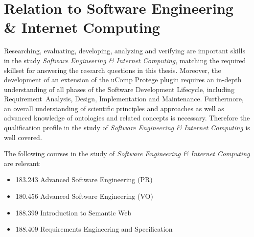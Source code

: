 \documentclass[12pt, notitlepage]{article}
\begin{document}
\section{Relation to Software Engineering \& Internet Computing}
Researching, evaluating, developing, analyzing and verifying are important skills in the study \emph{Software Engineering \& Internet Computing}, matching the required skillset for answering the research questions in this thesis. Moreover, the development of an extension of the uComp Protege plugin requires an in-depth understanding of all phases of the Software Development Lifecycle, including Requirement~Analysis, Design, Implementation and Maintenance. Furthermore, an overall understanding of scientific principles and approaches as well as advanced knowledge of ontologies and related concepts is necessary. Therefore the qualification profile in the study of \emph{Software Engineering \& Internet Computing} is well covered. 

The following courses in the study of \emph{Software Engineering \& Internet Computing} are relevant:
\begin{itemize}
	\item 183.243 Advanced Software Engineering (PR)
	\item 180.456 Advanced Software Engineering (VO)
	\item 188.399 Introduction to Semantic Web
	\item 188.409 Requirements Engineering and Specification
\end{itemize}

\newpage


\end{document}
